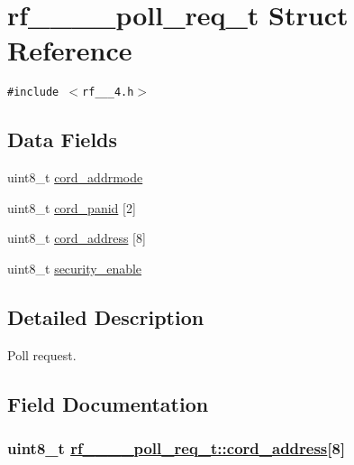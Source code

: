 \hypertarget{structrf__802__15__4__poll__req__t}{
\section{rf\_\_\_\_\-poll\_\-req\_\-t Struct Reference}
\label{structrf__802__15__4__poll__req__t}
}
{\tt \#include $<$rf\_\_\_\-4.h$>$}

\subsection*{Data Fields}
\begin{CompactItemize}
\item 
uint8\_\-t \hyperlink{structrf__802__15__4__poll__req__t_d8834b23b3a47d6183c90e1f2bf2bbf0}{cord\_\-addrmode}
\item 
uint8\_\-t \hyperlink{structrf__802__15__4__poll__req__t_9d3a01a8f05572f8d05984c79ca61648}{cord\_\-panid} \mbox{[}2\mbox{]}
\item 
uint8\_\-t \hyperlink{structrf__802__15__4__poll__req__t_705d43433da57f0838952b04bbedba91}{cord\_\-address} \mbox{[}8\mbox{]}
\item 
uint8\_\-t \hyperlink{structrf__802__15__4__poll__req__t_45a257887c33a9ab4551e27237f8c848}{security\_\-enable}
\end{CompactItemize}


\subsection{Detailed Description}
Poll request. 



\subsection{Field Documentation}
\hypertarget{structrf__802__15__4__poll__req__t_705d43433da57f0838952b04bbedba91}{
\subsubsection[cord\_\-address]{\setlength{\rightskip}{0pt plus 5cm}uint8\_\-t \hyperlink{structrf__802__15__4__poll__req__t_705d43433da57f0838952b04bbedba91}{rf\_\_\_\_\-poll\_\-req\_\-t::cord\_\-address}\mbox{[}8\mbox{]}}}
\label{structrf__802__15__4__poll__req__t_705d43433da57f0838952b04bbedba91}


